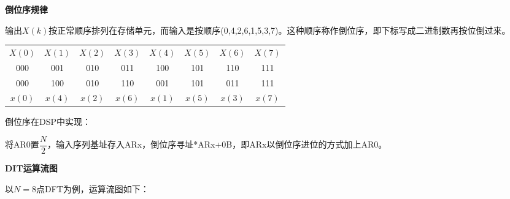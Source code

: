 \documentclass[cn, hazy, blue, normal, 14pt]{elegantnote}
\begin{document}
\textbf{倒位序规律}

输出$X(k)$按正常顺序排列在存储单元，而输入是按顺序(0,4,2,6,1,5,3,7)。这种顺序称作倒位序，即下标写成二进制数再按位倒过来。

\begin{table}[htbp]
\centering
\begin{tabular}{|c|c|c|c|c|c|c|c|}
    $X(0)$ & $X(1)$ & $X(2)$ & $X(3)$ & $X(4)$ & $X(5)$ & $X(6)$ & $X(7)$ \\
    000 & 001 & 010 & 011 & 100 & 101 & 110 & 111 \\
    000 & 100 & 010 & 110 & 001 & 101 & 011 & 111 \\
    $x(0)$ & $x(4)$ & $x(2)$ & $x(6)$ & $x(1)$ & $x(5)$ & $x(3)$ & $x(7)$
\end{tabular}
\end{table}

倒位序在DSP中实现：

将AR0置$\dfrac{N}{2}$，输入序列基址存入ARx，倒位序寻址*ARx+0B，即ARx以倒位序进位的方式加上AR0。

\textbf{DIT运算流图}

以$N=8$点DFT为例，运算流图如下：
\end{document}
